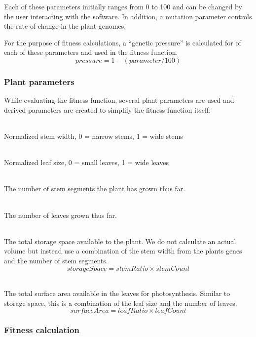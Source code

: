 \documentclass[conference]{acmsiggraph}
\begin{document}
Each of these parameters initially ranges from 0 to 100 and can be changed by
the user interacting with the software. In addition, a mutation parameter
controls the rate of change in the plant genomes.

For the purpose of fitness calculations, a ``genetic pressure'' is calculated
for of each of these parameters and used in the fitness function.
\[pressure = 1 - (parameter / 100)\]

\subsubsection{Plant parameters}

While evaluating the fitness function, several plant parameters are used and
derived parameters are created to simplify the fitness function itself:

\begin{description}[leftmargin=!,labelindent=0.2in,labelwidth=0.1in]
  \item[Stem ratio]    \hfill \\
    Normalized stem width, 0 = narrow stems, 1 = wide stems
  \item[Leaf ratio]    \hfill \\
    Normalized leaf size, 0 = small leaves, 1 = wide leaves
  \item[Stem count]    \hfill \\
    The number of stem segments the plant has grown thus far.
  \item[Leaf count]    \hfill \\
    The number of leaves grown thus far.
  \item[Storage space] \hfill \\
    The total storage space available to the plant. We do not calculate an
    actual volume but instead use a combination of the stem width from the
    plants genes and the number of stem segments.
    \[ storageSpace = stemRatio \times stemCount \]
  \item[Surface area]  \hfill \\
    The total surface area available in the leaves for photosynthesis. Similar
    to storage space, this is a combination of the leaf size and the number of
    leaves.
    \[ surfaceArea = leafRatio \times leafCount \]
\end{description}

\subsubsection{Fitness calculation}
\end{document}
